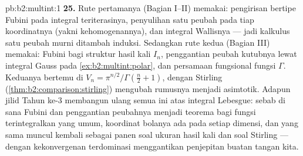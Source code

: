 \begin{solution}{pb:b2:multint:1}
\textbf{25.} Rute pertamanya (Bagian I--II) memakai: pengirisan bertipe
Fubini pada integral teriterasinya, penyulihan satu peubah
pada tiap koordinatnya (yakni kehomogenannya), dan integral Wallisnya
--- jadi kalkulus satu peubah murni ditambah induksi. Sedangkan rute kedua
(Bagian III) memakai: Fubini bagi struktur hasil kali $I_n$,
penggantian peubah kutubnya lewat integral Gauss pada
\cref{ex:b2:multint:polar}, dan persamaan fungsional fungsi
$\Gamma$. Keduanya bertemu di $V_n =
\pi^{n/2}/\Gamma(\frac n2 + 1)$, dengan Stirling
(\cref{thm:b2:comparison:stirling}) mengubah rumusnya
menjadi asimtotik. Adapun jilid Tahun ke-3 membangun ulang semua ini atas
integral Lebesgue: sebab di sana Fubini dan penggantian peubahnya
menjadi teorema bagi fungsi terintegralkan yang umum, koordinat bolanya
ada pada setiap dimensi, dan  yang sama
muncul kembali sebagai panen soal ukuran hasil kali dan soal
Stirling --- dengan kekonvergenan terdominasi menggantikan penjepitan buatan tangan kita.

\end{solution}
